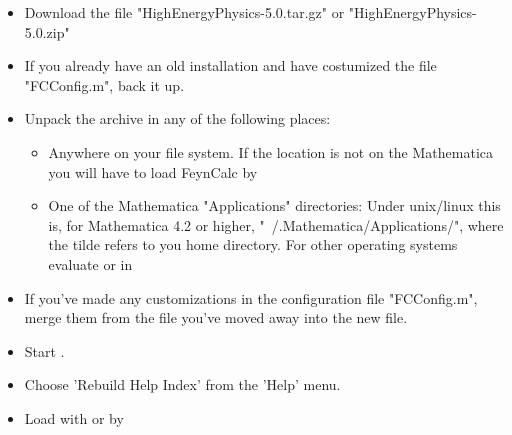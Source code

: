 \begin{itemize}

\item{Download the file "HighEnergyPhysics-5.0.tar.gz" or "HighEnergyPhysics-5.0.zip"}

\item{If you already have an old installation and have costumized the file "FCConfig.m", back it up.}

\item{Unpack the archive in any of the following places:

\begin{itemize}

\item{Anywhere on your file system. If the location is not on the Mathematica  you will have to load
FeynCalc by } 

\item One of the Mathematica "Applications" directories: Under {\sc unix}/{\sc linux} this is, for Mathematica 4.2 or higher,
"~/.Mathematica/Applications/", where the tilde refers to you home directory.
For other operating systems evaluate  or  in \mma
\end{itemize}
}

\item{If you've made any customizations in the configuration file "FCConfig.m", merge them from the file you've moved away into the new file.}

\item{Start \mma.}

\item{Choose 'Rebuild Help Index' from the 'Help' menu.}

\item Load \fc with  or by 

\end{itemize}




